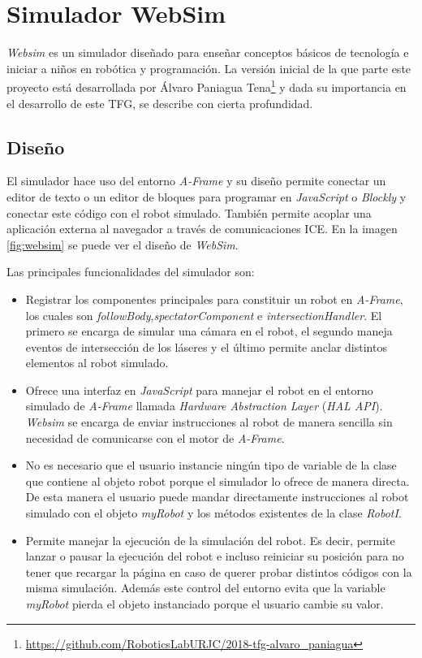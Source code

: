 \section{Simulador WebSim}

\textit{Websim} es un simulador diseñado para enseñar conceptos básicos de tecnología e iniciar a niños en robótica y programación. La versión inicial de la que parte este proyecto está desarrollada por Álvaro Paniagua Tena\footnote{\url{https://github.com/RoboticsLabURJC/2018-tfg-alvaro_paniagua}} y dada su  importancia en el desarrollo de este TFG, se describe con cierta profundidad.  

\subsection{Diseño}
\label{subsec:design}
El simulador hace uso del entorno \textit{A-Frame} y su diseño permite conectar un editor de texto o un editor de bloques para  programar en \textit{JavaScript} o \textit{Blockly} y conectar este código con el robot simulado. También permite acoplar una aplicación externa al navegador a través de comunicaciones ICE. En la imagen  \ref{fig:websim} se puede ver el diseño de \textit{WebSim}.

Las principales funcionalidades del simulador son: 

\begin{itemize}
    \item Registrar los componentes principales para constituir un robot en \textit{A-Frame}, los cuales son \textit{followBody},\textit{spectatorComponent} e \textit{intersectionHandler}. El primero se encarga de simular una cámara en el robot, el segundo maneja eventos de intersección de los láseres y el último permite anclar distintos elementos al robot simulado. 
    
    \item Ofrece una interfaz en \textit{JavaScript} para manejar el robot en el entorno simulado de \textit{A-Frame} llamada \textit{Hardware Abstraction Layer} (\textit{HAL API}). \textit{Websim} se encarga de enviar instrucciones al robot de manera sencilla sin necesidad de comunicarse con el motor de \textit{A-Frame}. 
    
    \item No es necesario que el usuario instancie ningún tipo de variable de la clase que contiene al objeto robot porque el simulador lo ofrece de manera directa. De esta manera el usuario puede mandar directamente instrucciones al robot simulado con el objeto \textit{myRobot} y los métodos existentes de la clase \textit{RobotI}.
    
    \item Permite manejar la ejecución de la simulación del robot. Es decir, permite lanzar o pausar la ejecución del robot e incluso reiniciar su posición para no tener que recargar la página en caso de querer probar distintos códigos con la misma simulación. Además este control del entorno evita que la variable \textit{myRobot} pierda el objeto instanciado porque el usuario cambie su valor.
\end{itemize}

